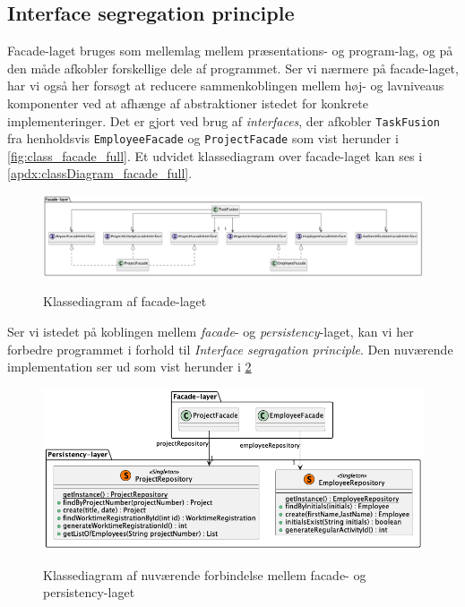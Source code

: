 \subsection{Interface segregation principle} \label{sec:solid_i}
Facade-laget bruges som mellemlag mellem præsentations- og program-lag, og på den måde afkobler forskellige dele af programmet. Ser vi nærmere på facade-laget, har vi også her forsøgt at reducere sammenkoblingen mellem høj- og lavniveaus komponenter ved at afhænge af abstraktioner istedet for konkrete implementeringer. Det er gjort ved brug af \textit{interfaces}, der afkobler \texttt{TaskFusion} fra henholdsvis \texttt{EmployeeFacade} og \texttt{ProjectFacade} som vist herunder i \cref{fig:class_facade_full}. Et udvidet klassediagram over facade-laget kan ses i \cref{apdx:classDiagram_facade_full}.
\begin{figure}[H]
  \centering
  \caption{Klassediagram af facade-laget}
  \includegraphics[width = \textwidth, keepaspectratio]{TaskFusion/out/assets/diagrams/class_facade_layer_simple/ClassDiagram_facade_simple.png}
  \label{fig:class_facade_simple}
\end{figure}
Ser vi istedet på koblingen mellem \textit{facade}- og \textit{persistency}-laget, kan vi her forbedre programmet i forhold til \textit{Interface segragation principle}. Den nuværende implementation ser ud som vist herunder i \cref{fig:class_facade_persistency_current}
\begin{figure}[H]
  \centering
  \caption{Klassediagram af nuværende forbindelse mellem facade- og persistency-laget}
  \includegraphics[width = 12cm, keepaspectratio]{TaskFusion/out/assets/diagrams/class_persistency_to_facade/persistency_to_facade_example.png}
  \label{fig:class_facade_persistency_current}
\end{figure}
